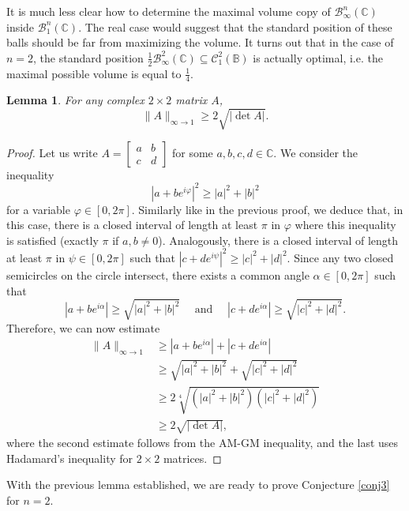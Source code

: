 \documentclass[12pt, a4paper]{article}
\theoremstyle{plain} %
\newtheorem{lemma}[theorem]{Lemma}       %
\theoremstyle{definition} %
\theoremstyle{remark} %
\begin{document}
It is much less clear how to determine the maximal volume copy of $\mathcal{B}_{\infty}^n(\mathbb{C})$ inside $\mathcal{B}_1^n(\mathbb{C})$. The real case would suggest that the standard position of these balls should be far from maximizing the volume. It turns out that in the case of $n=2$, the standard position $\frac{1}{2}\mathcal{B}_{\infty}^2(\mathbb{C}) \subseteq \mathcal{C}_1^2(\mathbb{B}) $ is actually optimal, i.e. the maximal possible volume is equal to $\frac{1}{4}$.

\begin{lemma} \label{lem:2d_bm_volume_ineq}
For any complex $2 \times 2$ matrix $A$,
\begin{equation} \label{ineq:2d_bm_vol}
 \|A\|_{\infty \to 1} \geq 2 \sqrt{|\det {A}|}.
\end{equation}
\end{lemma}
\begin{proof}
    Let us write $A = \begin{bmatrix} a & b \\ c & d
    \end{bmatrix}$ for some $a, b, c, d \in \mathbb{C}$. We consider the inequality
$$|a + b e^{i\varphi}|^2 \geq |a|^2 + |b|^2$$
for a variable $\varphi \in [0, 2 \pi]$. Similarly like in the previous proof, we deduce that, in this case, there is a closed interval of length at least $\pi$ in $\varphi$ where this inequality is satisfied (exactly $\pi$ if $a, b \neq 0$). Analogously, there is a closed interval of length at least $\pi$ in $\psi \in [0, 2 \pi]$ such that $|c + d e^{i\psi}|^2 \geq |c|^2+|d|^2$. Since any two closed semicircles on the circle intersect, there exists a common angle $\alpha \in [0, 2\pi]$ such that
$$|a + b e^{i \alpha}| \geq \sqrt{|a|^2 + |b|^2} \quad \text{ and } \quad |c + d e^{i \alpha}| \geq \sqrt{|c|^2 + |d|^2}.$$
Therefore, we can now estimate
\begin{align*}
\|A\|_{\infty \to 1}
&\geq |a + b e^{i \alpha}| + |c + d e^{i \alpha}| \\
&\geq \sqrt{|a|^2 + |b|^2} + \sqrt{|c|^2 + |d|^2} \\
&\geq 2 \sqrt[4]{(|a|^2 + |b|^2)(|c|^2 + |d|^2)} \\
&\geq 2 \sqrt{|\det A|},
\end{align*}
where the second estimate follows from the AM-GM inequality, and the last uses Hadamard's inequality for $ 2\times 2$ matrices.


\end{proof}

With the previous lemma established, we are ready to prove Conjecture \ref{conj3} for $n=2$.
\end{document}
